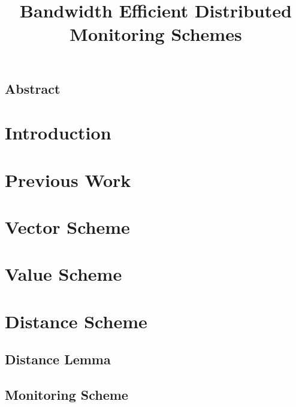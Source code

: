 \documentclass[10pt,a4paper]{article}
\begin{document}
\onehalfspacing
\sloppy
\setlength{\parindent}{0pt}


\title{Bandwidth Efficient Distributed Monitoring Schemes}
\date{}
\maketitle


\begin{multicols*}{2}
\begin{center}
\section*{Abstract}
\end{center}

\section{Introduction}

\section{Previous Work}

\section{Vector Scheme}

\section{Value Scheme}

\section{Distance Scheme}
\subsection{Distance Lemma}
\subsection{Monitoring Scheme}


\end{multicols*}
\end{document}
